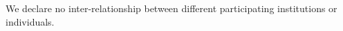 

We declare no inter-relationship between different participating institutions or individuals.

\FloatBarrier
\clearpage
